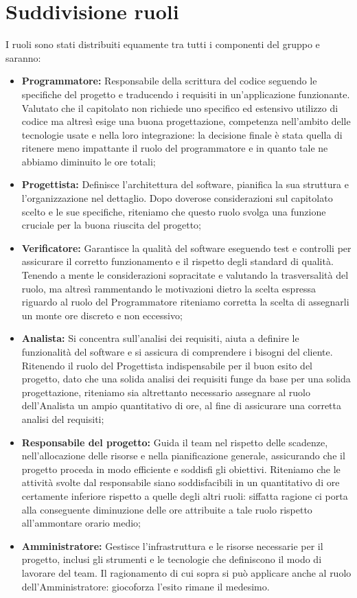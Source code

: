 \documentclass[8pt]{article}
\begin{document}
\section{Suddivisione ruoli} \label{Suddivisione ruoli}
I ruoli sono stati distribuiti equamente tra tutti i componenti del gruppo e saranno:
\begin{itemize}
	\item \textbf{Programmatore:} Responsabile della scrittura del codice seguendo le specifiche del progetto e traducendo i requisiti in un'applicazione funzionante. Valutato che il capitolato non richiede uno specifico ed estensivo utilizzo di codice
	ma altresì esige una buona progettazione, competenza nell'ambito delle tecnologie usate e nella loro integrazione: la decisione finale è stata quella di ritenere meno impattante il ruolo del programmatore e in quanto tale ne abbiamo diminuito le ore totali;
	\item \textbf{Progettista:} Definisce l'architettura del software, pianifica la sua struttura e l'organizzazione nel dettaglio. Dopo doverose considerazioni sul capitolato scelto e le sue specifiche, riteniamo che questo ruolo svolga una funzione cruciale per la buona riuscita del progetto;
	\item \textbf{Verificatore:} Garantisce la qualità del software eseguendo test e controlli per assicurare il corretto funzionamento e il rispetto degli standard di qualità. Tenendo a mente le considerazioni sopracitate e valutando la trasversalità del ruolo, ma altresì rammentando le motivazioni dietro la scelta espressa riguardo al ruolo del Programmatore riteniamo corretta la scelta di assegnarli un monte ore discreto e non eccessivo;
	\item \textbf{Analista:} Si concentra sull'analisi dei requisiti, aiuta a definire le funzionalità del software e si assicura di comprendere i bisogni del cliente. Ritenendo il ruolo del Progettista indispensabile per il buon esito del progetto, dato che una solida analisi dei requisiti funge da base per una solida progettazione, riteniamo sia altrettanto necessario assegnare al ruolo dell'Analista un ampio quantitativo di ore, al fine di assicurare una corretta analisi del requisiti;
	\item \textbf{Responsabile del progetto:} Guida il team nel rispetto delle scadenze, nell'allocazione delle risorse e nella pianificazione generale, assicurando che il progetto proceda in modo efficiente e soddisfi gli obiettivi. Riteniamo che le attività svolte dal responsabile siano soddisfacibili in un quantitativo di ore certamente inferiore rispetto a quelle degli altri ruoli: siffatta ragione ci porta alla conseguente diminuzione delle ore attribuite a tale ruolo rispetto all'ammontare orario medio;
	\item \textbf{Amministratore:} Gestisce l'infrastruttura e le risorse necessarie per il progetto, inclusi gli strumenti e le tecnologie che definiscono il modo di lavorare del team. Il ragionamento di cui sopra si può applicare anche al ruolo dell'Amministratore: giocoforza l'esito rimane il medesimo.	
\end{itemize}
\end{document}
